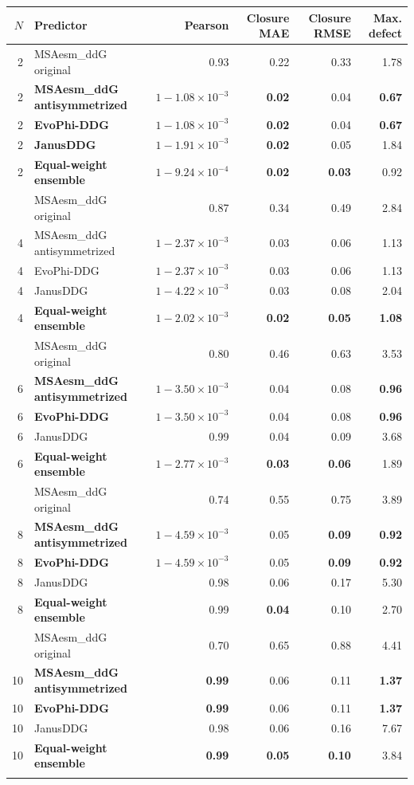 \begin{tabular}{rlrrrr}\toprule $N$ & Predictor & Pearson & Closure MAE & Closure RMSE & Max. defect\\\midrule
2 & MSAesm\_ddG original & 0.93 & 0.22 & 0.33 & 1.78 \\
2 & \textbf{MSAesm\_ddG antisymmetrized} & $1-1.08\times10^{-3}$ & \textbf{0.02} & 0.04 & \textbf{0.67} \\
2 & \textbf{EvoPhi-DDG} & $1-1.08\times10^{-3}$ & \textbf{0.02} & 0.04 & \textbf{0.67} \\
2 & \textbf{JanusDDG} & $1-1.91\times10^{-3}$ & \textbf{0.02} & 0.05 & 1.84 \\
2 & \textbf{Equal-weight ensemble} & \textbf{\boldmath $1-9.24\times10^{-4}$} & \textbf{0.02} & \textbf{0.03} & 0.92 \\
\addlinespace
4 & MSAesm\_ddG original & 0.87 & 0.34 & 0.49 & 2.84 \\
4 & MSAesm\_ddG antisymmetrized & $1-2.37\times10^{-3}$ & 0.03 & 0.06 & 1.13 \\
4 & EvoPhi-DDG & $1-2.37\times10^{-3}$ & 0.03 & 0.06 & 1.13 \\
4 & JanusDDG & $1-4.22\times10^{-3}$ & 0.03 & 0.08 & 2.04 \\
4 & \textbf{Equal-weight ensemble} & \textbf{\boldmath $1-2.02\times10^{-3}$} & \textbf{0.02} & \textbf{0.05} & \textbf{1.08} \\
\addlinespace
6 & MSAesm\_ddG original & 0.80 & 0.46 & 0.63 & 3.53 \\
6 & \textbf{MSAesm\_ddG antisymmetrized} & $1-3.50\times10^{-3}$ & 0.04 & 0.08 & \textbf{0.96} \\
6 & \textbf{EvoPhi-DDG} & $1-3.50\times10^{-3}$ & 0.04 & 0.08 & \textbf{0.96} \\
6 & JanusDDG & 0.99 & 0.04 & 0.09 & 3.68 \\
6 & \textbf{Equal-weight ensemble} & \textbf{\boldmath $1-2.77\times10^{-3}$} & \textbf{0.03} & \textbf{0.06} & 1.89 \\
\addlinespace
8 & MSAesm\_ddG original & 0.74 & 0.55 & 0.75 & 3.89 \\
8 & \textbf{MSAesm\_ddG antisymmetrized} & \textbf{\boldmath $1-4.59\times10^{-3}$} & 0.05 & \textbf{0.09} & \textbf{0.92} \\
8 & \textbf{EvoPhi-DDG} & \textbf{\boldmath $1-4.59\times10^{-3}$} & 0.05 & \textbf{0.09} & \textbf{0.92} \\
8 & JanusDDG & 0.98 & 0.06 & 0.17 & 5.30 \\
8 & \textbf{Equal-weight ensemble} & 0.99 & \textbf{0.04} & 0.10 & 2.70 \\
\addlinespace
10 & MSAesm\_ddG original & 0.70 & 0.65 & 0.88 & 4.41 \\
10 & \textbf{MSAesm\_ddG antisymmetrized} & \textbf{0.99} & 0.06 & 0.11 & \textbf{1.37} \\
10 & \textbf{EvoPhi-DDG} & \textbf{0.99} & 0.06 & 0.11 & \textbf{1.37} \\
10 & JanusDDG & 0.98 & 0.06 & 0.16 & 7.67 \\
10 & \textbf{Equal-weight ensemble} & \textbf{0.99} & \textbf{0.05} & \textbf{0.10} & 3.84 \\
\addlinespace
\bottomrule\end{tabular}
